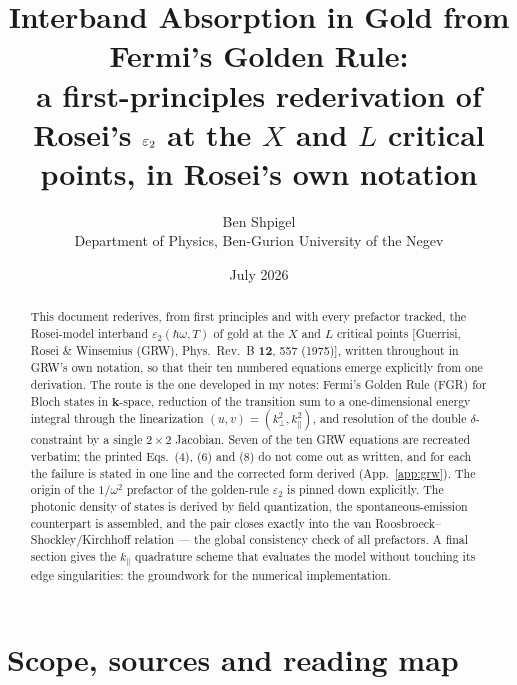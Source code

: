 \documentclass[11pt,a4paper]{article}
\title{\bfseries Interband Absorption in Gold from Fermi's Golden Rule:\\
a first-principles rederivation of Rosei's $\eps_2$ at the $X$ and $L$
critical points, in Rosei's own notation}
\author{Ben Shpigel\\ \small Department of Physics, Ben-Gurion University of the Negev}
\date{July 2026}
\numberwithin{equation}{section}
\newcommand{\hw}{\hbar\omega}
\newcommand{\kperp}{k_{\perp}}
\newcommand{\kpar}{k_{\parallel}}
\newcommand{\eps}{\varepsilon}
\begin{document}
\maketitle

\begin{abstract}
\noindent
This document rederives, from first principles and with every prefactor
tracked, the Rosei-model interband $\eps_2(\hw,T)$ of gold at the $X$
and $L$ critical points [Guerrisi, Rosei \& Winsemius (GRW), Phys.\
Rev.\ B \textbf{12}, 557 (1975)], written throughout in GRW's own
notation, so that their ten numbered equations emerge explicitly from
one derivation.  The route is the one developed in my notes: Fermi's
Golden Rule (FGR) for Bloch states in $\mathbf{k}$-space, reduction of
the transition sum to a one-dimensional energy integral through the
linearization $(u,v)=(\kperp^2,\kpar^2)$, and resolution of the double
$\delta$-constraint by a single $2\times2$ Jacobian.  Seven of the ten
GRW equations are recreated verbatim; the printed Eqs.~(4), (6) and
(8) do not come out as written, and for each the failure is stated in
one line and the corrected form derived (App.~\ref{app:grw}).  The
origin of the $1/\omega^2$ prefactor of the golden-rule $\eps_2$ is
pinned down explicitly.  The photonic density of states is derived by
field quantization, the spontaneous-emission counterpart is assembled,
and the pair closes exactly into the van Roosbroeck--Shockley/Kirchhoff
relation --- the global consistency check of all prefactors.  A final
section gives the $\kpar$ quadrature scheme that evaluates the model
without touching its edge singularities: the groundwork for the
numerical implementation.
\end{abstract}

\tableofcontents

\section{Scope, sources and reading map}
\end{document}
